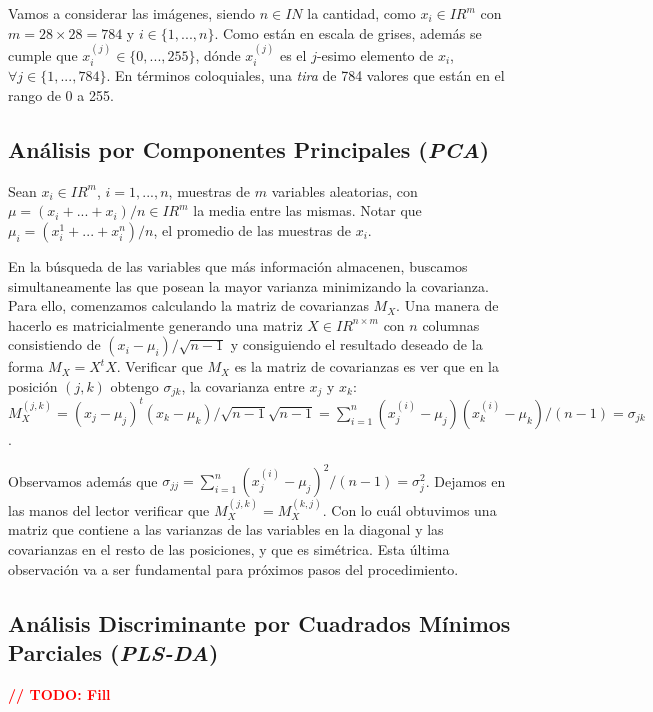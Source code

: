 Vamos a considerar las im\'agenes, siendo $n \in I\!N$ la cantidad, como $x_{i} \in I\!R^{m}$ con $m = 28 \times 28 = 784$ y $i \in \{1, ..., n\}$. Como est\'an en escala de grises, adem\'as se cumple que $x_{i}^{(j)} \in \{0, ..., 255\}$, d\'onde $x_{i}^{(j)}$ es el $j$-esimo elemento de $x_{i}$, $\forall j \in \{1, ..., 784\}$. En t\'erminos coloquiales, una \textit{tira} de 784 valores que est\'an en el rango de 0 a 255.

\subsection{An\'alisis por Componentes Principales (\textit{PCA})}

Sean $x_{i} \in I\!R^{m}$, $i = 1, ..., n$, muestras de $m$ variables aleatorias, con $\mu = (x_{i} + ... + x_{i}) / n \in I\!R^{m}$ la media entre las mismas. Notar que $\mu_{i} = (x_{i}^{1} + ... + x_{i}^{n}) / n$, el promedio de las muestras de $x_{i}$.

En la b\'usqueda de las variables que m\'as informaci\'on almacenen, buscamos simultaneamente las que posean la mayor varianza minimizando la covarianza. Para ello, comenzamos calculando la matriz de covarianzas $M_{X}$. Una manera de hacerlo es matricialmente generando una matriz $X \in I\!R^{n \times m}$ con $n$ columnas consistiendo de $(x_{i} - \mu_{i}) / \sqrt{n - 1}$ y consiguiendo el resultado deseado de la forma $M_{X} = X^{t}X$. Verificar que $M_{X}$ es la matriz de covarianzas es ver que en la posici\'on $(j, k)$ obtengo $\sigma_{jk}$, la covarianza entre $x_{j}$ y $x_{k}$: \\

$M_{X}^{(j,k)} = (x_{j} - \mu_{j})^t(x_{k} - \mu_{k}) / \sqrt{n - 1}\sqrt{n - 1} = \sum\limits_{i = 1}^{n}(x_{j}^{(i)} - \mu_{j})(x_{k}^{(i)} - \mu_{k}) / (n - 1) = \sigma_{jk}$.

Observamos adem\'as que $\sigma_{jj} = \sum\limits_{i = 1}^{n}(x_{j}^{(i)} - \mu_{j})^{2} / (n - 1) = \sigma_{j}^{2}$. Dejamos en las manos del lector verificar que $M_{X}^{(j,k)} = M_{X}^{(k,j)}$. Con lo cu\'al obtuvimos una matriz que contiene a las varianzas de las variables en la diagonal y las covarianzas en el resto de las posiciones, y que es sim\'etrica. Esta \'ultima observaci\'on va a ser fundamental para pr\'oximos pasos del procedimiento.

\subsection{An\'alisis Discriminante por Cuadrados M\'inimos Parciales (\textit{PLS-DA})}

\textbf{\textcolor{red}{// TODO: Fill}}
